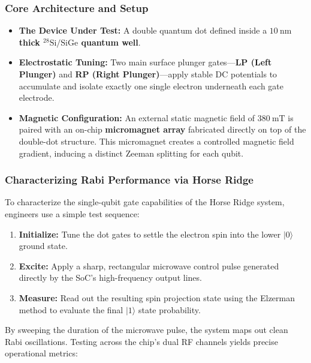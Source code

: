 \documentclass[
]{article}
\providecommand{\tightlist}{%
  \setlength{\itemsep}{0pt}\setlength{\parskip}{0pt}}
\begin{document}
\subsubsection{Core Architecture and
Setup}\label{core-architecture-and-setup}

\begin{itemize}
\tightlist
\item
  \textbf{The Device Under Test:} A double quantum dot defined inside a
  \textbf{\(10\ \text{nm}\) thick \(\text{}^{28}\text{Si/SiGe}\) quantum
  well}.
\item
  \textbf{Electrostatic Tuning:} Two main surface plunger
  gates---\textbf{LP (Left Plunger)} and \textbf{RP (Right
  Plunger)}---apply stable DC potentials to accumulate and isolate
  exactly one single electron underneath each gate electrode.
\item
  \textbf{Magnetic Configuration:} An external static magnetic field of
  \(380\ \text{mT}\) is paired with an on-chip \textbf{micromagnet
  array} fabricated directly on top of the double-dot structure. This
  micromagnet creates a controlled magnetic field gradient, inducing a
  distinct Zeeman splitting for each qubit.
\end{itemize}

\subsubsection{Characterizing Rabi Performance via Horse
Ridge}\label{characterizing-rabi-performance-via-horse-ridge}

To characterize the single-qubit gate capabilities of the Horse Ridge
system, engineers use a simple test sequence:

\begin{enumerate}
\def\labelenumi{\arabic{enumi}.}
\tightlist
\item
  \textbf{Initialize:} Tune the dot gates to settle the electron spin
  into the lower \(|0\rangle\) ground state.
\item
  \textbf{Excite:} Apply a sharp, rectangular microwave control pulse
  generated directly by the SoC's high-frequency output lines.
\item
  \textbf{Measure:} Read out the resulting spin projection state using
  the Elzerman method to evaluate the final \(|1\rangle\) state
  probability.
\end{enumerate}

By sweeping the duration of the microwave pulse, the system maps out
clean Rabi oscillations. Testing across the chip's dual RF channels
yields precise operational metrics:
\end{document}
